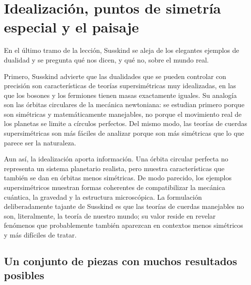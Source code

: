 \begin{classroomqa}
\end{classroomqa}

\section{Idealización, puntos de simetría especial y el paisaje}

En el último tramo de la lección, Susskind se aleja de los elegantes ejemplos de dualidad y se pregunta qué nos dicen, y qué no, sobre el mundo real.

Primero, Susskind advierte que las dualidades que se pueden controlar con precisión son características de teorías supersimétricas muy idealizadas, en las que los bosones y los fermiones tienen masas exactamente iguales. Su analogía son las órbitas circulares de la mecánica newtoniana: se estudian primero porque son simétricas y matemáticamente manejables, no porque el movimiento real de los planetas se limite a círculos perfectos. Del mismo modo, las teorías de cuerdas supersimétricas son más fáciles de analizar porque son más simétricas que lo que parece ser la naturaleza.

Aun así, la idealización aporta información. Una órbita circular perfecta no representa un sistema planetario realista, pero muestra características que también se dan en órbitas menos simétricas. De modo parecido, los ejemplos supersimétricos muestran formas coherentes de compatibilizar la mecánica cuántica, la gravedad y la estructura microscópica. La formulación deliberadamente tajante de Susskind es que las teorías de cuerdas manejables no son, literalmente, la teoría de nuestro mundo; su valor reside en revelar fenómenos que probablemente también aparezcan en contextos menos simétricos y más difíciles de tratar.

\subsection{Un conjunto de piezas con muchos resultados posibles}

